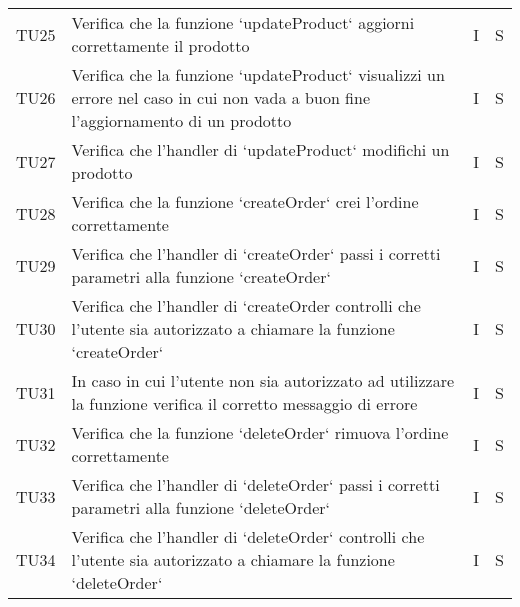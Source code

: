 \begin{center}
\begin{longtable}[!h]{p{45px} p{255px} p{35px} p{35px}}
        TU25          & Verifica che la funzione `updateProduct` aggiorni correttamente il prodotto           & I              & S              \\
        TU26          & Verifica che la funzione `updateProduct` visualizzi un errore nel caso in cui non vada a buon fine l'aggiornamento di un prodotto           & I              & S              \\
        TU27          & Verifica che l'handler di `updateProduct` modifichi un prodotto                                                                                                                                  & I              & S              \\
        TU28          & Verifica che la funzione `createOrder` crei l'ordine correttamente                                                                                                                               & I              & S              \\
        TU29          & Verifica che l'handler di `createOrder` passi i corretti parametri alla funzione `createOrder`                                                                                                   & I              & S              \\
        TU30          & Verifica che l'handler di `createOrder controlli che l'utente sia autorizzato a chiamare la funzione `createOrder`                                                                               & I              & S              \\
        TU31          & In caso in cui l'utente non sia autorizzato ad utilizzare la funzione verifica il corretto messaggio di errore & I & S \\
        TU32          & Verifica che la funzione `deleteOrder` rimuova l'ordine correttamente                                                                                                                            & I              & S              \\
        TU33          & Verifica che l'handler di `deleteOrder` passi i corretti parametri alla funzione `deleteOrder`                                                                                                   & I              & S              \\
        TU34          & Verifica che l'handler di `deleteOrder` controlli che l'utente sia autorizzato a chiamare la funzione `deleteOrder`                                                                              & I              & S              \\

\end{longtable}
\end{center}
